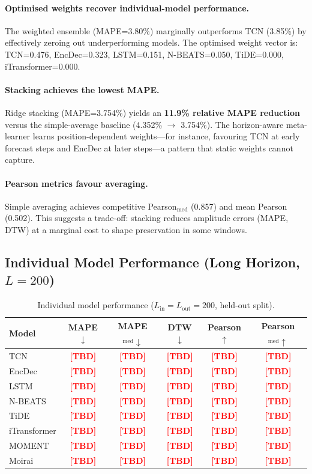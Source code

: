 \documentclass[11pt,a4paper]{article}
\newcommand{\TBD}{\textcolor{red}{\textbf{[TBD]}}}
\begin{document}
\paragraph{Optimised weights recover individual-model performance.}
The weighted ensemble (MAPE=3.80\%) marginally outperforms TCN (3.85\%) by
effectively zeroing out underperforming models.  The optimised weight vector is:
TCN=0.476, EncDec=0.323, LSTM=0.151, N-BEATS=0.050, TiDE=0.000, iTransformer=0.000.

\paragraph{Stacking achieves the lowest MAPE.}
Ridge stacking (MAPE=3.754\%) yields an \textbf{11.9\% relative MAPE reduction}
versus the simple-average baseline (4.352\% $\to$ 3.754\%).  The horizon-aware
meta-learner learns position-dependent weights—for instance, favouring TCN at
early forecast steps and EncDec at later steps—a pattern that static weights
cannot capture.

\paragraph{Pearson metrics favour averaging.}
Simple averaging achieves competitive Pearson$_{\mathrm{med}}$ (0.857) and mean
Pearson (0.502).  This suggests a trade-off: stacking reduces amplitude errors
(MAPE, DTW) at a marginal cost to shape preservation in some windows.

\subsection{Individual Model Performance (Long Horizon, $L=200$)}

\begin{table}[H]
  \centering
  \caption{Individual model performance ($L_{\mathrm{in}}=L_{\mathrm{out}}=200$,
           held-out split).}
  \label{tab:individual_200}
  \begin{tabular}{lccccc}
    \toprule
    Model & MAPE$\downarrow$ & MAPE$_{\mathrm{med}}\downarrow$ &
            DTW$\downarrow$ & Pearson$\uparrow$ &
            Pearson$_{\mathrm{med}}\uparrow$ \\
    \midrule
    TCN          & \TBD & \TBD & \TBD & \TBD & \TBD \\
    EncDec       & \TBD & \TBD & \TBD & \TBD & \TBD \\
    LSTM         & \TBD & \TBD & \TBD & \TBD & \TBD \\
    N-BEATS      & \TBD & \TBD & \TBD & \TBD & \TBD \\
    TiDE         & \TBD & \TBD & \TBD & \TBD & \TBD \\
    iTransformer & \TBD & \TBD & \TBD & \TBD & \TBD \\
    MOMENT       & \TBD & \TBD & \TBD & \TBD & \TBD \\
    Moirai       & \TBD & \TBD & \TBD & \TBD & \TBD \\
    \bottomrule
  \end{tabular}
\end{table}
\end{document}
